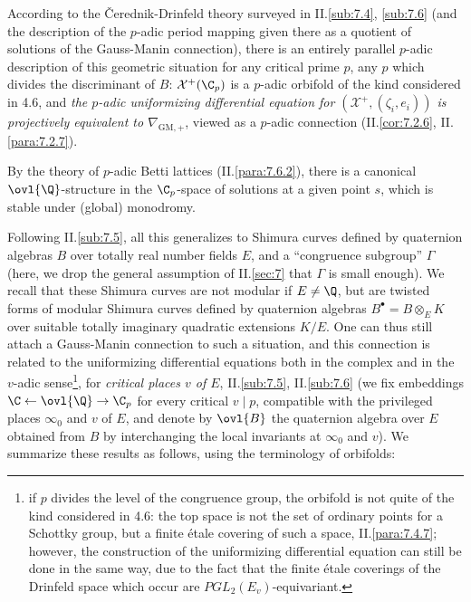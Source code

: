 \begin{para}\label{para::4.7.2} According to the \v{C}erednik-Drinfeld theory
 surveyed in II.\ref{sub:7.4}, \ref{sub:7.6} (and the description of
 the $p$-adic period mapping given there as a quotient of solutions of
 the Gauss-Manin connection), there is an entirely parallel $p$-adic
 description of this geometric situation for any critical prime $p$, \ie
 any $p$ which divides the discriminant of $B$: $\mathcal{X}^+(\C_p)$ is
 a $p$-adic orbifold of the kind considered in 4.6, and {\it the
 $p$-adic uniformizing differential equation for $(\mathcal{X}^+,
 (\zeta_i,e_i))$ is projectively equivalent to
 $\nabla_{\mathrm{GM},+}$}, viewed 
 as a $p$-adic connection (\cf II.\ref{cor:7.2.6}, II.\ref{para:7.2.7}).

 By the theory of $p$-adic Betti lattices (\cf  II.\ref{para:7.6.2}),
 there is a canonical $\ovl{\Q}$-structure in the $\C_p$-space of
 solutions at a given point $s$, which is stable under (global) monodromy.
\end{para}

\begin{para}\label{para::4.7.3} Following  II.\ref{sub:7.5}, all this generalizes to
 Shimura curves defined by quaternion algebras $B$ over totally real
number fields $E$, and a ``congruence subgroup'' $\Gamma$ (here, we drop
the general assumption of II.\ref{sec:7} that $\Gamma$ is small enough). We
recall that these Shimura curves are not modular if $E\neq \Q$, but are
twisted forms of modular Shimura curves defined by quaternion algebras
$B^\bullet = B\otimes_E K$ over suitable totally imaginary quadratic
extensions $K/E$.  One can thus still attach a Gauss-Manin connection to
such a situation, and this connection is related to the uniformizing
differential equations both in the complex and in the $v$-adic
sense\footnote{if $p$ divides the level of the congruence group, the
orbifold is not quite of the kind considered in 4.6: the top space is
not the set of ordinary points for a Schottky group, but a finite
\'etale covering of such a space, \cf II.\ref{para:7.4.7}; however, the
construction of the uniformizing differential equation can still be done
in the same way, due to the fact that the finite \'etale coverings of
the Drinfeld space which occur are $PGL_2(E_v)$-equivariant.}, for {\it
critical places $v$ of $E$}, \cf II.\ref{sub:7.5}, II.\ref{sub:7.6} (we
fix embeddings $\C \leftarrow \ovl{\Q} \to \C_p$ for every critical
$v\mid p$, compatible with the privileged places $\infty_0$ and $v$ of
$E$, and denote by $\ovl{B}$ the quaternion algebra over $E$ obtained
from $B$ by interchanging the local invariants at $\infty_0$ and
$v$). We summarize these results as follows, using the terminology of
orbifolds:


\end{para}

